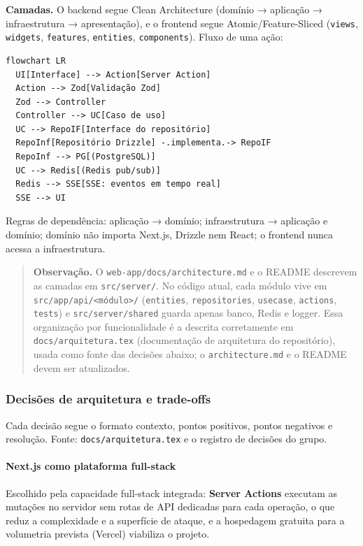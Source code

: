 \documentclass[
  brazilian,
  11pt,
]{article}
\begin{document}
\textbf{Camadas.} O backend segue Clean Architecture (domínio → aplicação → infraestrutura → apresentação), e o frontend segue Atomic/Feature-Sliced (\texttt{views}, \texttt{widgets}, \texttt{features}, \texttt{entities}, \texttt{components}). Fluxo de uma ação:

\begin{verbatim}
flowchart LR
  UI[Interface] --> Action[Server Action]
  Action --> Zod[Validação Zod]
  Zod --> Controller
  Controller --> UC[Caso de uso]
  UC --> RepoIF[Interface do repositório]
  RepoInf[Repositório Drizzle] -.implementa.-> RepoIF
  RepoInf --> PG[(PostgreSQL)]
  UC --> Redis[(Redis pub/sub)]
  Redis --> SSE[SSE: eventos em tempo real]
  SSE --> UI
\end{verbatim}

Regras de dependência: aplicação → domínio; infraestrutura → aplicação e domínio; domínio não importa Next.js, Drizzle nem React; o frontend nunca acessa a infraestrutura.

\begin{quote}
\textbf{Observação.} O \texttt{web-app/docs/architecture.md} e o README descrevem as camadas em \texttt{src/server/}. No código atual, cada módulo vive em \texttt{src/app/api/\textless{}módulo\textgreater{}/} (\texttt{entities}, \texttt{repositories}, \texttt{usecase}, \texttt{actions}, \texttt{tests}) e \texttt{src/server/shared} guarda apenas banco, Redis e logger. Essa organização por funcionalidade é a descrita corretamente em \texttt{docs/arquitetura.tex} (documentação de arquitetura do repositório), usada como fonte das decisões abaixo; o \texttt{architecture.md} e o README devem ser atualizados.
\end{quote}

\subsubsection{Decisões de arquitetura e trade-offs}\label{decisuxf5es-de-arquitetura-e-trade-offs}

Cada decisão segue o formato contexto, pontos positivos, pontos negativos e resolução. Fonte: \texttt{docs/arquitetura.tex} e o registro de decisões do grupo.

\paragraph{Next.js como plataforma full-stack}\label{next.js-como-plataforma-full-stack}

Escolhido pela capacidade full-stack integrada: \textbf{Server Actions} executam as mutações no servidor sem rotas de API dedicadas para cada operação, o que reduz a complexidade e a superfície de ataque, e a hospedagem gratuita para a volumetria prevista (Vercel) viabiliza o projeto.
\end{document}
